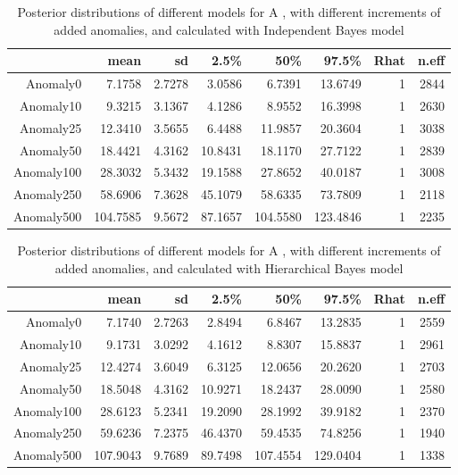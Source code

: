 \begin{table}[ht]
	\centering
	\begin{tabular}{rrrrrrrr}
		\hline
		& mean & sd & 2.5\% & 50\% & 97.5\% & Rhat & n.eff \\ 
		\hline
		Anomaly0 & 7.1758 & 2.7278 & 3.0586 & 6.7391 & 13.6749 & 1 & 2844 \\ 
		Anomaly10 & 9.3215 & 3.1367 & 4.1286 & 8.9552 & 16.3998 & 1 & 2630 \\ 
		Anomaly25 & 12.3410 & 3.5655 & 6.4488 & 11.9857 & 20.3604 & 1 & 3038 \\ 
		Anomaly50 & 18.4421 & 4.3162 & 10.8431 & 18.1170 & 27.7122 & 1 & 2839 \\ 
		Anomaly100 & 28.3032 & 5.3432 & 19.1588 & 27.8652 & 40.0187 & 1 & 3008 \\ 
		Anomaly250 & 58.6906 & 7.3628 & 45.1079 & 58.6335 & 73.7809 & 1 & 2118 \\ 
		Anomaly500 & 104.7585 & 9.5672 & 87.1657 & 104.5580 & 123.4846 & 1 & 2235 \\ 
		\hline
	\end{tabular}
	\caption{Posterior distributions of different models for A , with different increments of added anomalies, and calculated with Independent Bayes model} 
	\label{tab:pstanoA}
\end{table}

\begin{table}[ht]
	\centering
	\begin{tabular}{rrrrrrrr}
		\hline
		& mean & sd & 2.5\% & 50\% & 97.5\% & Rhat & n.eff \\ 
		\hline
		Anomaly0 & 7.1740 & 2.7263 & 2.8494 & 6.8467 & 13.2835 & 1 & 2559 \\ 
		Anomaly10 & 9.1731 & 3.0292 & 4.1612 & 8.8307 & 15.8837 & 1 & 2961\\ 
		Anomaly25 & 12.4274 & 3.6049 & 6.3125 & 12.0656 & 20.2620 & 1 & 2703 \\ 
		Anomaly50 & 18.5048 & 4.3162 & 10.9271 & 18.2437 & 28.0090 & 1 & 2580 \\ 
		Anomaly100 & 28.6123 & 5.2341 & 19.2090 & 28.1992 & 39.9182 & 1 & 2370 \\ 
		Anomaly250 & 59.6236 & 7.2375 & 46.4370 & 59.4535 & 74.8256 & 1 & 1940 \\ 
		Anomaly500 & 107.9043 & 9.7689 & 89.7498 & 107.4554 & 129.0404 & 1 & 1338 \\ 
		\hline
	\end{tabular}
	\caption{Posterior distributions of different models for A , with different increments of added anomalies, and calculated with Hierarchical Bayes model} 
	\label{tab:pstanoA2}
\end{table}

